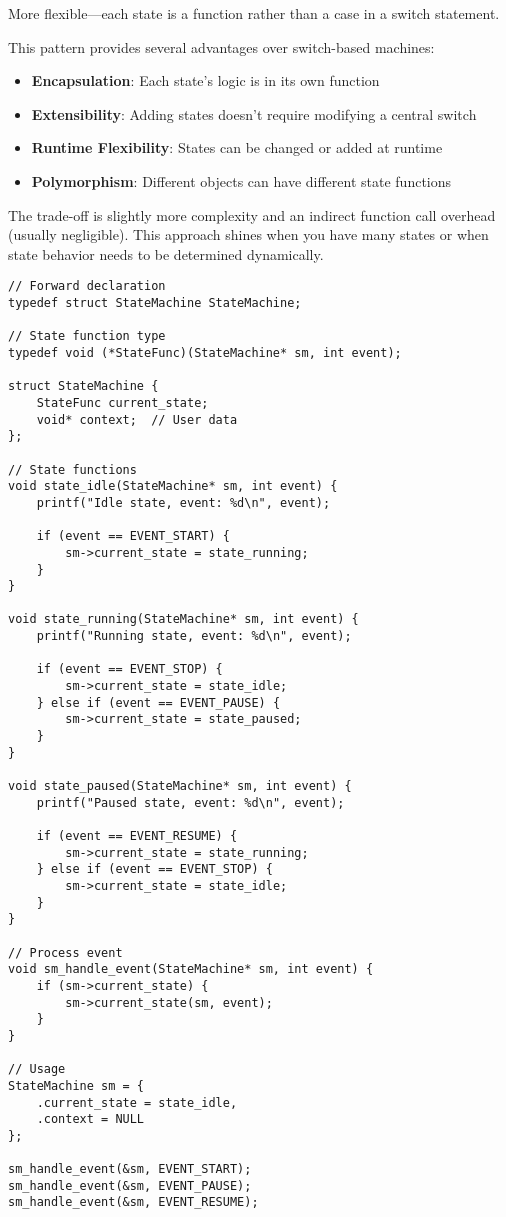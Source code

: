 More flexible---each state is a function rather than a case in a switch statement.

This pattern provides several advantages over switch-based machines:

\begin{itemize}
    \item \textbf{Encapsulation}: Each state's logic is in its own function
    \item \textbf{Extensibility}: Adding states doesn't require modifying a central switch
    \item \textbf{Runtime Flexibility}: States can be changed or added at runtime
    \item \textbf{Polymorphism}: Different objects can have different state functions
\end{itemize}

The trade-off is slightly more complexity and an indirect function call overhead (usually negligible). This approach shines when you have many states or when state behavior needs to be determined dynamically.

\begin{lstlisting}
// Forward declaration
typedef struct StateMachine StateMachine;

// State function type
typedef void (*StateFunc)(StateMachine* sm, int event);

struct StateMachine {
    StateFunc current_state;
    void* context;  // User data
};

// State functions
void state_idle(StateMachine* sm, int event) {
    printf("Idle state, event: %d\n", event);

    if (event == EVENT_START) {
        sm->current_state = state_running;
    }
}

void state_running(StateMachine* sm, int event) {
    printf("Running state, event: %d\n", event);

    if (event == EVENT_STOP) {
        sm->current_state = state_idle;
    } else if (event == EVENT_PAUSE) {
        sm->current_state = state_paused;
    }
}

void state_paused(StateMachine* sm, int event) {
    printf("Paused state, event: %d\n", event);

    if (event == EVENT_RESUME) {
        sm->current_state = state_running;
    } else if (event == EVENT_STOP) {
        sm->current_state = state_idle;
    }
}

// Process event
void sm_handle_event(StateMachine* sm, int event) {
    if (sm->current_state) {
        sm->current_state(sm, event);
    }
}

// Usage
StateMachine sm = {
    .current_state = state_idle,
    .context = NULL
};

sm_handle_event(&sm, EVENT_START);
sm_handle_event(&sm, EVENT_PAUSE);
sm_handle_event(&sm, EVENT_RESUME);
\end{lstlisting}

